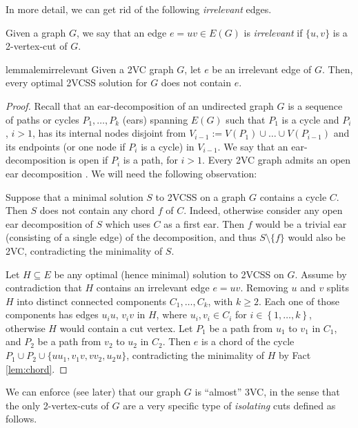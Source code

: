 \documentclass{article}
\newcommand{\set}[1]{\left\{#1 \right\}}
\begin{document}
In more detail, we can get rid of the following \emph{irrelevant} edges.
\begin{definition}
Given a graph $G$, we say that an edge $e=uv\in E(G)$ is \emph{irrelevant} if $\{u,v\}$ is a 2-vertex-cut of $G$.
\end{definition}
\begin{restatable}{lemma}{lemirrelevant}\label{lem:irrelevant}
Given a 2VC graph $G$, let $e$ be an irrelevant edge of $G$. Then, every optimal 2VCSS solution for $G$ does not contain $e$.
\end{restatable}
\begin{proof}
Recall that an ear-decomposition of an undirected graph $G$ is a sequence of paths or cycles $P_1,\ldots,P_k$ (ears) spanning $E(G)$ such that $P_1$ is a cycle and $P_i$, $i > 1$, has its internal nodes disjoint from $V_{i-1}:=V(P_1)\cup\ldots\cup V(P_{i-1})$ and its endpoints (or one node if $P_i$ is a cycle) in $V_{i-1}$. We say that an ear-decomposition is open if $P_i$ is a path, for $i > 1$. Every 2VC graph admits an open ear decomposition \cite[Chapter~15]{S03}. We will need the following observation: 
\begin{fact}\label{lem:chord}
Suppose that a minimal solution $S$ to 2VCSS on a graph $G$ contains a cycle $C$. Then $S$ does not contain any chord $f$ of $C$. Indeed, otherwise consider any open ear decomposition of $S$ which uses $C$ as a first ear. Then $f$ would be a trivial ear (consisting of a single edge) of the decomposition, and thus $S\setminus \{f\}$ would also be 2VC, contradicting the minimality of $S$.
\end{fact}

Let $H\subseteq E$ be any optimal (hence minimal) solution to 2VCSS on $G$. Assume by contradiction that $H$ contains an irrelevant edge $e=uv$. Removing $u$ and $v$ splits $H$ into distinct connected components $C_1,\dots, C_k$, with $k\geq 2$. Each one of those components has edges $u_iu$, $v_iv$ in $H$, where $u_i, v_i\in C_i$ for $i\in \set{1,\dots, k}$, otherwise $H$ would contain a cut vertex. Let $P_1$ be a path from $u_1$ to $v_1$ in $C_1$, and $P_2$ be a path from $v_2$ to $u_2$ in $C_2$. Then $e$ is a chord of the cycle $P_1\cup P_2\cup\{uu_1,v_1v,vv_2,u_2u\}$, contradicting the minimality of $H$ by Fact \ref{lem:chord}.
\end{proof}
We can enforce (see later) that our graph $G$ is ``almost'' 3VC, in the sense that the only 2-vertex-cuts of $G$ are a very specific type of \emph{isolating} cuts defined as follows.
\end{document}
